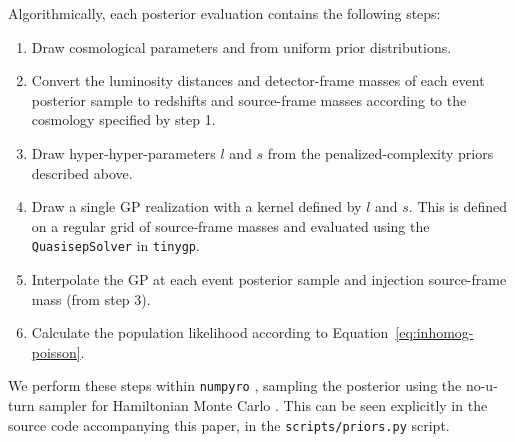 \documentclass[preprint2,linenumbers]{aastex631}
\begin{document}
Algorithmically, each posterior evaluation contains the following steps: 
\begin{enumerate}
    \item Draw cosmological parameters \Ho{} and \Omm{} from uniform prior distributions.
    \item Convert the luminosity distances and detector-frame masses of each event posterior sample to redshifts and source-frame masses according to the cosmology specified by step 1.
    \item Draw hyper-hyper-parameters $l$ and $s$ from the penalized-complexity priors described above.
    \item Draw a single \ac{GP} realization with a kernel defined by $l$ and $s$.
    This is defined on a regular grid of source-frame masses and evaluated using the \texttt{QuasisepSolver} in \texttt{tinygp}.
    \item Interpolate the \ac{GP} at each event posterior sample and injection source-frame mass (from step 3).
    \item Calculate the population likelihood according to Equation~\ref{eq:inhomog-poisson}.
\end{enumerate}
We perform these steps within \texttt{numpyro} \citep{bingham_pyro_2019,phan_composable_2019}, sampling the posterior using the no-u-turn sampler for Hamiltonian Monte Carlo \citep{hoffman_no-u-turn_2011}. 
This can be seen explicitly in the source code accompanying this paper, in the \texttt{scripts/priors.py} script.


\end{document}
